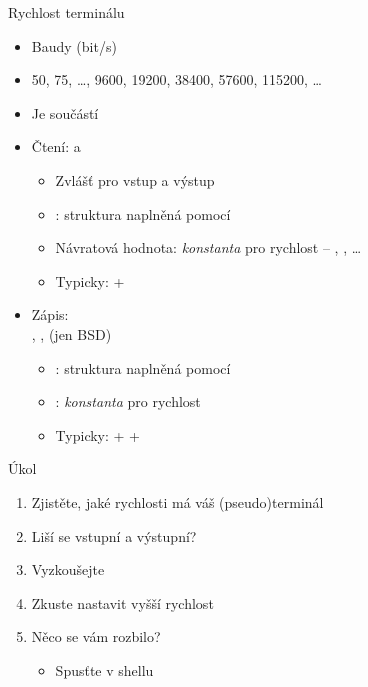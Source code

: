 \begin{frame}{Rychlost terminálu}

  \begin{itemize}
    \item Baudy (bit/s)
    \item 50, 75, \dots, 9600, 19200, 38400, 57600, 115200, \dots

    \pause

    \item Je součástí 

    \item Čtení:  a
    \begin{itemize}
      \item Zvlášť pro vstup a výstup
      \item {}: struktura naplněná pomocí 
      \item Návratová hodnota: \emph{konstanta} pro rychlost -- ,
        , \dots
      \item Typicky:  + 
    \end{itemize}

    \pause

    \item Zápis:  \\
      , ,  (jen BSD)
    \begin{itemize}
      \item {}: struktura naplněná pomocí 
      \item {}: \emph{konstanta} pro rychlost
      \item Typicky:  +  + 
    \end{itemize}
  \end{itemize}

\end{frame}

\begin{frame}{Úkol}

  \begin{enumerate}
    \item Zjistěte, jaké rychlosti má váš (pseudo)terminál
    \item Liší se vstupní a výstupní?
    \item Vyzkoušejte
    \item Zkuste nastavit vyšší rychlost

    \item Něco se vám rozbilo?
    \begin{itemize}
      \item Spusťte v shellu 
    \end{itemize}

  \end{enumerate}

\end{frame}

